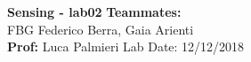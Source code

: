 \noindent
\large\textbf{Sensing - lab02} \hfill \textbf{Teammates:} \\
\normalsize FBG \hfill  Federico Berra, Gaia Arienti\\
\textbf{Prof:} Luca Palmieri \hfill Lab Date: 12/12/2018
